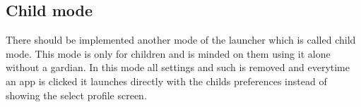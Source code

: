 \subsection{Child mode}
\label{backlog:child_mode}

There should be implemented another mode of the launcher which is called child mode. This mode is only for children and is minded on them using it alone without a gardian. In this mode all settings and such is removed and everytime an app is clicked it launches directly with the childs preferences instead of showing the select profile screen.